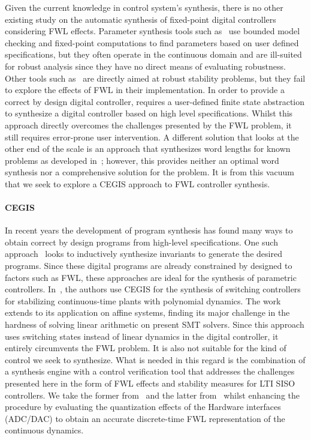 \documentclass{sig-alternate-05-2015}
\begin{document}
Given the current knowledge in control system's synthesis, there is no other
existing study on the automatic synthesis of fixed-point digital controllers
considering FWL effects.  Parameter synthesis tools such
as~\cite{cimatti2013parameter} use bounded model checking and fixed-point
computations to find parameters based on user defined specifications, but
they often operate in the continuous domain and are ill-suited for robust
analysis since they have no direct means of evaluating robustness.  Other
tools such as~\cite{economakos2016automated} are directly aimed at robust
stability problems, but they fail to explore the effects of FWL in their
implementation.  In order to provide a correct by design digital controller,
\cite{alur2016compositional} requires a user-defined finite state
abstraction to synthesize a digital controller based on high level
specifications.  Whilst this approach directly overcomes the challenges
presented by the FWL problem, it still requires error-prone user
intervention.  A different solution that looks at the other end of the scale
is an approach that synthesizes word lengths for known problems as developed
in~\cite{jha2013swati}; however, this provides neither an optimal word
synthesis nor a comprehensive solution for the problem.  It is from this
vacuum that we seek to explore a CEGIS approach to FWL controller synthesis.

\paragraph{CEGIS}

In recent years the development of program synthesis has found many ways to
obtain correct by design programs from high-level specifications.  One such
approach~\cite{itzhaky2010simple} looks to inductively synthesize invariants
to generate the desired programs.  Since these digital programs are already
constrained by designed to factors such as FWL, these approaches are ideal
for the synthesis of parametric controllers. 
In~\cite{DBLP:conf/cdc/RavanbakhshS15}, the authors use CEGIS for the
synthesis of switching controllers for stabilizing continuous-time plants
with polynomial dynamics.  The work extends to its application on affine
systems, finding its major challenge in the hardness of solving linear
arithmetic on present SMT solvers.  Since this approach uses switching
states instead of linear dynamics in the digital controller, it entirely
circumvents the FWL problem.  It is also not suitable for the kind of
control we seek to synthesize.  What is needed in this regard is the
combination of a synthesis engine with a control verification tool that
addresses the challenges presented here in the form of FWL effects and
stability measures for LTI SISO controllers.  We take the former
from~\cite{DBLP:conf/lpar/DavidKL15} and the latter from~\cite{daes20161}
whilst enhancing the procedure by evaluating the quantization effects of
the Hardware interfaces (ADC/DAC) to obtain an accurate discrete-time FWL
representation of the continuous dynamics.
 
\end{document}
